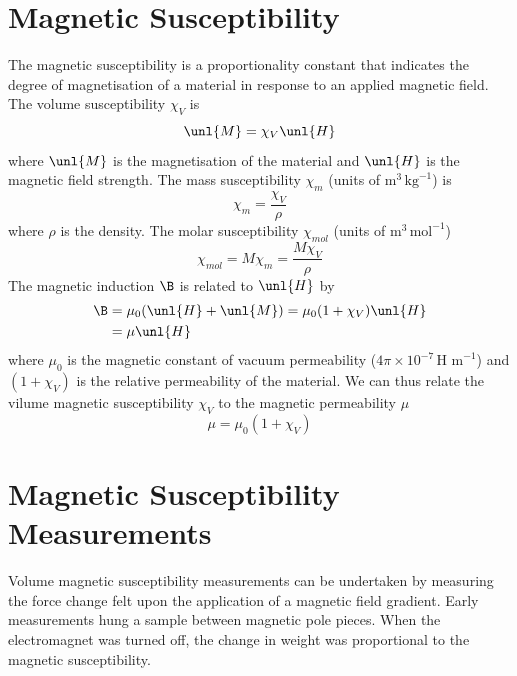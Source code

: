 \documentclass[a4paper, 11pt, normalem]{report}
\begin{document}
\section{Magnetic Susceptibility}
The magnetic susceptibility is a proportionality constant that indicates the degree of magnetisation of a material in response to an applied magnetic field. 
The volume susceptibility $\chi_V$ is
\begin{equation}
    \unl{M} = \chi_V\unl{H}
\end{equation}
where $\unl{M}$ is the magnetisation of the material and $\unl{H}$ is the magnetic field strength. 
The mass susceptibility $\chi_m$ (units of $\text{m}^3\,\text{kg}^{-1}$) is
\begin{equation}
    \chi_m = \frac{\chi_V}{\rho}
\end{equation}
where $\rho$ is the density.
The molar susceptibility $\chi_{mol}$ (units of $\text{m}^3\,\text{mol}^{-1}$)
\begin{equation}
    \chi_{mol} = M\chi_m = \frac{M\chi_V}{\rho}
\end{equation}
The magnetic induction $\B$ is related to $\unl{H}$ by
\begin{align}
    \B &= \mu_0(\unl{H}+\unl{M}) = \mu_0(1+\chi_V)\unl{H} \\
       &= \mu\unl{H}
\end{align}
where $\mu_0$ is the magnetic constant of vacuum permeability ($4\pi\times10^{-7}\,\text{H m}^{-1}$) and $(1+\chi_V)$ is the relative permeability of the material.
We can thus relate the vilume magnetic susceptibility $\chi_V$ to the magnetic permeability $\mu$
\begin{equation}
    \mu = \mu_0(1+\chi_V)
\end{equation}

\section{Magnetic Susceptibility Measurements}
Volume magnetic susceptibility measurements can be undertaken by measuring the force change felt upon the application of a magnetic field gradient. 
Early measurements hung a sample between magnetic pole pieces. 
When the electromagnet was turned off, the change in weight was proportional to the magnetic susceptibility. 
\end{document}
